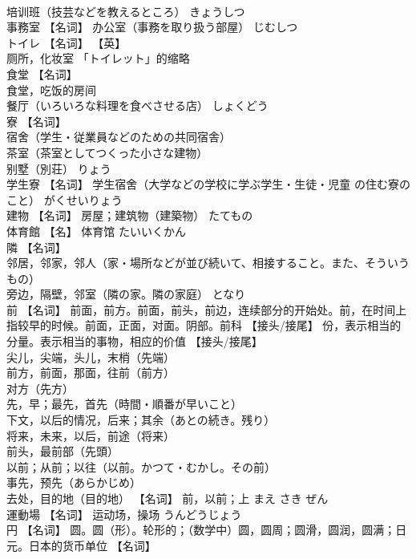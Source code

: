 \documentclass[8pt]{extreport}
\begin{document}
\begin{CJK}{UTF8}{min}
\\	培训班（技芸などを教えるところ）	きょうしつ	
\\	事務室	【名词】 办公室（事務を取り扱う部屋）	じむしつ	
\\	トイレ	【名词】 【英】
\\	厕所，化妆室		「トイレット」的缩略
\\	食堂	【名词】 
\\	食堂，吃饭的房间 
\\	餐厅（いろいろな料理を食べさせる店）	しょくどう	
\\	寮	【名词】 
\\	宿舍（学生・従業員などのための共同宿舎） 
\\	茶室（茶室としてつくった小さな建物） 
\\	别墅（別荘）	りょう	
\\	学生寮	【名词】 学生宿舍（大学などの学校に学ぶ学生・生徒・児童 の住む寮のこと）	がくせいりょう	
\\	建物	【名词】 房屋；建筑物（建築物）	たてもの	
\\	体育館	【名】 体育馆	たいいくかん	
\\	隣	【名词】 
\\	邻居，邻家，邻人（家・場所などが並び続いて、相接すること。また、そういうもの） 
\\	旁边，隔壁，邻室（隣の家。隣の家庭）	となり	
\\	前	【名词】 前面，前方。前面，前头，前边，连续部分的开始处。前，在时间上指较早的时候。前面，正面，对面。阴部。前科 【接头/接尾】 份，表示相当的分量。表示相当的事物，相应的价值 【接头/接尾】 
\\	尖儿，尖端，头儿，末梢（先端） 
\\	前方，前面，那面，往前（前方） 
\\	对方（先方） 
\\	先，早；最先，首先（時間・順番が早いこと） 
\\	下文，以后的情况，后来；其余（あとの続き。残り） 
\\	将来，未来，以后，前途（将来） 
\\	前头，最前部（先頭） 
\\	以前；从前；以往（以前。かつて・むかし。その前） 
\\	事先，预先（あらかじめ） 
\\	去处，目的地（目的地） 【名词】 前，以前；上	まえ さき ぜん	
\\	運動場	【名词】 运动场，操场	うんどうじょう	
\\	円	【名词】 圆。圆（形）。轮形的；（数学中）圆，圆周；圆滑，圆润，圆满；日元。日本的货币单位 【名词】 

\end{CJK}
\end{document}
